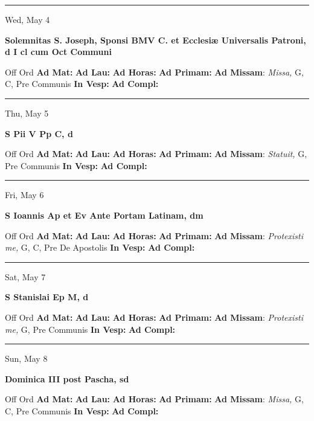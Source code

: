 \documentclass[letterpaper, 10pt]{article}
\begin{document}
\hrule
\begin{center}
Wed, May 4
\end{center}\textbf{ \large Solemnitas S. Joseph, Sponsi BMV C. et Ecclesiæ Universalis Patroni, \textnormal{\normalsize d I cl cum Oct Communi}}
\begin{justify}
Off Ord
\textbf{Ad Mat: }
\textbf{Ad Lau: }
\textbf{Ad Horas: }
\textbf{Ad Primam: }
\textbf{Ad Missam}: \textit{Missa,} G, C, Pre Communis
\textbf{In Vesp: }
\textbf{Ad Compl: }\end{justify}



\hrule
\begin{center}
Thu, May 5
\end{center}\textbf{ \large S Pii V Pp C, \textnormal{\normalsize d}}
\begin{justify}
Off Ord
\textbf{Ad Mat: }
\textbf{Ad Lau: }
\textbf{Ad Horas: }
\textbf{Ad Primam: }
\textbf{Ad Missam}: \textit{Statuit,} G, Pre Communis
\textbf{In Vesp: }
\textbf{Ad Compl: }\end{justify}



\hrule
\begin{center}
Fri, May 6
\end{center}\textbf{ \large S Ioannis Ap et Ev Ante Portam Latinam, \textnormal{\normalsize dm}}
\begin{justify}
Off Ord
\textbf{Ad Mat: }
\textbf{Ad Lau: }
\textbf{Ad Horas: }
\textbf{Ad Primam: }
\textbf{Ad Missam}: \textit{Protexisti me,} G, C, Pre De Apostolis
\textbf{In Vesp: }
\textbf{Ad Compl: }\end{justify}



\hrule
\begin{center}
Sat, May 7
\end{center}\textbf{ \large S Stanislai Ep M, \textnormal{\normalsize d}}
\begin{justify}
Off Ord
\textbf{Ad Mat: }
\textbf{Ad Lau: }
\textbf{Ad Horas: }
\textbf{Ad Primam: }
\textbf{Ad Missam}: \textit{Protexisti me,} G, Pre Communis
\textbf{In Vesp: }
\textbf{Ad Compl: }\end{justify}



\hrule
\begin{center}
Sun, May 8
\end{center}\textbf{ \large Dominica III post Pascha, \textnormal{\normalsize sd}}
\begin{justify}
Off Ord
\textbf{Ad Mat: }
\textbf{Ad Lau: }
\textbf{Ad Horas: }
\textbf{Ad Primam: }
\textbf{Ad Missam}: \textit{Missa,} G, C, Pre Communis
\textbf{In Vesp: }
\textbf{Ad Compl: }\end{justify}
\end{document}
